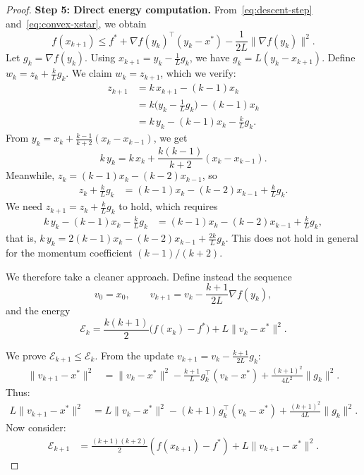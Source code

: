 \documentclass[11pt,a4paper]{article}
\begin{document}
\begin{proof}
\textbf{Step 5: Direct energy computation.}
From~\eqref{eq:descent-step} and~\eqref{eq:convex-xstar}, we obtain
\begin{equation}\label{eq:combined-ineq}
  f(x_{k+1}) \le f^* + \nabla f(y_k)^\top(y_k - x^*)
  - \frac{1}{2L}\|\nabla f(y_k)\|^2.
\end{equation}
Let $g_k = \nabla f(y_k)$. Using $x_{k+1} = y_k - \frac{1}{L}g_k$,
we have $g_k = L(y_k - x_{k+1})$. Define
$w_k = z_k + \frac{k}{L}g_k$. We claim $w_k = z_{k+1}$, which we
verify:
\begin{align*}
  z_{k+1} &= k\,x_{k+1} - (k-1)x_k \\
  &= k\bigl(y_k - \tfrac{1}{L}g_k\bigr) - (k-1)x_k \\
  &= k\,y_k - (k-1)x_k - \tfrac{k}{L}g_k.
\end{align*}
From $y_k = x_k + \frac{k-1}{k+2}(x_k - x_{k-1})$, we get
\[
  k\,y_k = k\,x_k + \frac{k(k-1)}{k+2}(x_k - x_{k-1}).
\]
Meanwhile, $z_k = (k-1)x_k - (k-2)x_{k-1}$, so
\begin{align*}
  z_k + \tfrac{k}{L}g_k
  &= (k-1)x_k - (k-2)x_{k-1} + \tfrac{k}{L}g_k.
\end{align*}
We need $z_{k+1} = z_k + \frac{k}{L}g_k$ to hold, which requires
\begin{align*}
  k\,y_k - (k-1)x_k - \tfrac{k}{L}g_k
  &= (k-1)x_k - (k-2)x_{k-1} + \tfrac{k}{L}g_k,
\end{align*}
that is, $k\,y_k = 2(k-1)x_k - (k-2)x_{k-1} + \frac{2k}{L}g_k$.
This does not hold in general for the momentum coefficient
$(k-1)/(k+2)$.

We therefore take a cleaner approach. Define instead the sequence
\begin{equation}\label{eq:vk-def}
  v_0 = x_0, \qquad
  v_{k+1} = v_k - \frac{k+1}{2L}\nabla f(y_k),
\end{equation}
and the energy
\begin{equation}\label{eq:energy-v}
  \mathcal{E}_k = \frac{k(k+1)}{2}\bigl(f(x_k) - f^*\bigr)
  + L\|v_k - x^*\|^2.
\end{equation}

We prove $\mathcal{E}_{k+1} \le \mathcal{E}_k$. From the update
$v_{k+1} = v_k - \frac{k+1}{2L}g_k$:
\begin{align}
  \|v_{k+1} - x^*\|^2
  &= \|v_k - x^*\|^2 - \frac{k+1}{L}g_k^\top(v_k - x^*)
    + \frac{(k+1)^2}{4L^2}\|g_k\|^2. \label{eq:vk-expand}
\end{align}
Thus:
\begin{align}
  L\|v_{k+1} - x^*\|^2
  &= L\|v_k - x^*\|^2 - (k+1)g_k^\top(v_k - x^*)
    + \frac{(k+1)^2}{4L}\|g_k\|^2. \label{eq:Lvk}
\end{align}
Now consider:
\begin{align}
  \mathcal{E}_{k+1}
  &= \frac{(k+1)(k+2)}{2}(f(x_{k+1}) - f^*) + L\|v_{k+1} - x^*\|^2.
    \label{eq:Ek1}
\end{align}


\end{proof}
\end{document}
